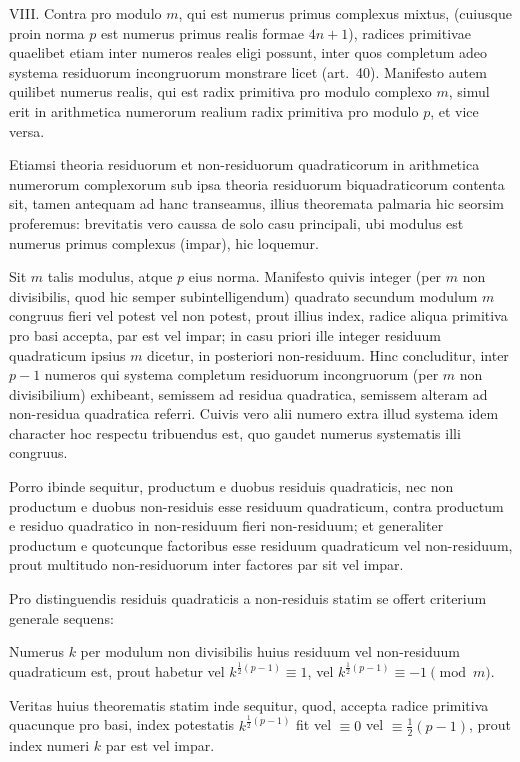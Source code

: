 VIII. Contra pro modulo $m$, qui est numerus primus complexus mixtus, (cuiusque proin norma $p$ est numerus primus realis formae $4n+1$), radices primitivae quaelibet etiam inter numeros reales eligi possunt, inter quos completum adeo systema residuorum incongruorum monstrare licet (art.~40). Manifesto autem quilibet numerus realis, qui est radix primitiva pro modulo complexo $m$, simul erit in arithmetica numerorum realium radix primitiva pro modulo $p$, et vice versa.

Etiamsi theoria residuorum et non-residuorum quadraticorum in arithmetica numerorum complexorum sub ipsa theoria residuorum biquadraticorum contenta sit, tamen antequam ad hanc transeamus, illius theoremata palmaria hic seorsim proferemus: brevitatis vero caussa de solo casu principali, ubi modulus est numerus primus complexus (impar), hic loquemur.

Sit $m$ talis modulus, atque $p$ eius norma. Manifesto quivis integer (per $m$ non divisibilis, quod hic semper subintelligendum) quadrato secundum modulum $m$ congruus fieri vel potest vel non potest, prout illius index, radice aliqua primitiva pro basi accepta, par est vel impar; in casu priori ille integer residuum quadraticum ipsius $m$ dicetur, in posteriori non-residuum. Hinc concluditur, inter $p-1$ numeros qui systema completum residuorum incongruorum (per $m$ non divisibilium) exhibeant, semissem ad residua quadratica, semissem alteram ad non-residua quadratica referri. Cuivis vero alii numero extra illud systema idem
%
character hoc respectu tribuendus est, quo gaudet numerus systematis illi congruus.

Porro ibinde sequitur, productum e duobus residuis quadraticis, nec non productum e duobus non-residuis esse residuum quadraticum, contra productum e residuo quadratico in non-residuum fieri non-residuum; et generaliter productum e quotcunque factoribus esse residuum quadraticum vel non-residuum, prout multitudo non-residuorum inter factores par sit vel impar.

Pro distinguendis residuis quadraticis a non-residuis statim se offert criterium generale sequens:

Numerus $k$ per modulum non divisibilis huius residuum vel non-residuum quadraticum est, prout habetur vel $k^{\frac12(p-1)}\equiv1$, vel $k^{\frac12(p-1)}\equiv-1\pmod m$.

Veritas huius theorematis statim inde sequitur, quod, accepta radice primitiva quacunque pro basi, index potestatis $k^{\frac12(p-1)}$ fit vel $\equiv0$ vel $\equiv\frac12(p-1)$, prout index numeri $k$ par est vel impar.

